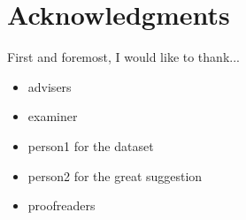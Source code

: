 \chapter{Acknowledgments}

First and foremost, I would like to thank...
\begin{itemize}
\item{advisers}
\item{examiner}
\item{person1 for the dataset}
\item{person2 for the great suggestion}
\item{proofreaders}
\end{itemize}
